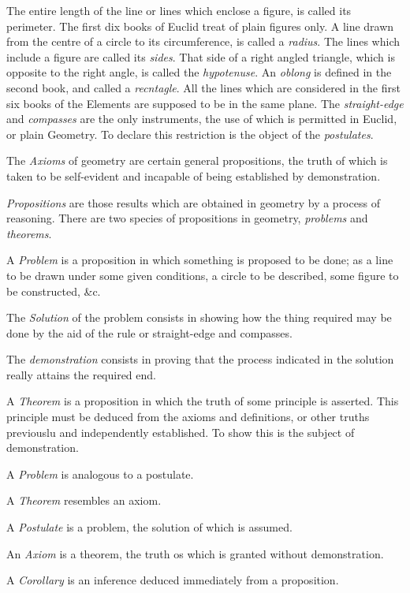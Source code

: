 The entire length of the line or lines which enclose a figure, is called its perimeter. The first dix books of Euclid treat of plain figures only. A line drawn from the centre of a circle to its circumference, is called a \textit{radius}. The lines which include a figure are called its \textit{sides}. That side of a right angled triangle, which is opposite to the right angle, is called the \textit{hypotenuse}. An \textit{oblong} is defined in the second book, and called a \textit{recntagle}. All the lines which are considered in the first six books of the Elements are supposed to be in the same plane. 
The \textit{straight-edge} and \textit{compasses} are the only instruments, the use of which is permitted in Euclid, or plain Geometry. To declare this restriction is the object of the \textit{postulates}. 

The \textit{Axioms} of geometry are certain general propositions, the truth of which is taken to be self-evident and incapable of being established by demonstration. 

\textit{Propositions} are those results which are obtained in geometry by a process of reasoning. There are two species of propositions in geometry, \textit{problems} and \textit{theorems}. 

A \textit{Problem} is a proposition in which something is proposed to be done; as a line to be drawn under some given conditions, a circle to be described, some figure to be constructed, \&c. 

The \textit{Solution} of the problem consists in showing how the thing required may be done by the aid of the rule or straight-edge and compasses. 

The \textit{demonstration} consists in proving that the process indicated in the solution really attains the required end. 

A \textit{Theorem} is a proposition in which the truth of some principle is asserted. This principle must be deduced from the axioms and definitions, or other truths previouslu and independently established. To show this is the subject of demonstration. 

A \textit{Problem} is analogous to a postulate. 

A \textit{Theorem} resembles an axiom. 

A \textit{Postulate} is a problem, the solution of which is assumed. 

An \textit{Axiom} is a theorem, the truth os which is granted without demonstration. 

A \textit{Corollary} is an inference deduced immediately from a proposition. 

